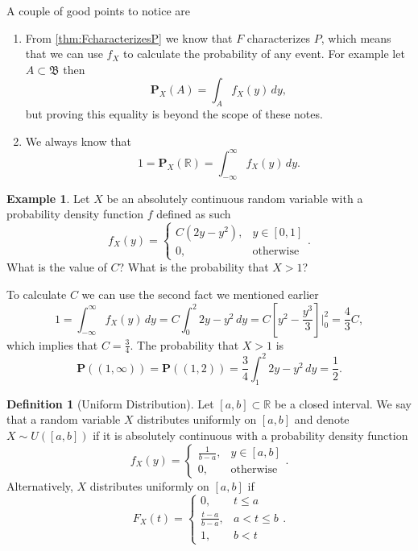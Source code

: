 \documentclass[11pt,a4paper]{article}
\theoremstyle{definition}
\newtheorem{definition}{Definition}[section]
\newtheorem{example}{Example}[section]
\theoremstyle{plain}
\newcommand{\R}{\mathbb{R}}
\begin{document}
  A couple of good points to notice are
  \begin{enumerate}
    \item From \autoref{thm:FcharacterizesP} we know that $F$ characterizes $P$,
    which means that we can use $f_X$ to calculate the probability of any
    event. For example let $A \subset \mathfrak B$ then
    \[
      \mathbf P_X(A) = \int_{A} f_X(y)\,dy,
    \]
    but proving this equality is beyond the scope of these notes.
    \item We always know that
    \[
      1 = \mathbf P_X(\R) = \int_{-\infty}^{\infty} f_X(y)\,dy.
    \]
  \end{enumerate}

  \begin{example}
    Let $X$ be an absolutely continuous random variable with a probability
    density function $f$ defined as such
    \[
      f_X(y) =
      \begin{cases}
        C(2y - y^2), &y \in [0,1] \\
        0, &\text{otherwise}
      \end{cases}.
    \]
    What is the value of $C$? What is the probability that $X > 1$?

    To calculate $C$ we can use the second fact we mentioned earlier
    \[
      1 =
      \int_{-\infty}^{\infty} f_X(y)\,dy =
      C \int_{0}^{2} 2y - y^2\,dy =
      C\left[y^2 - \frac{y^3}{3}\right]\biggr\vert_{0}^{2} =
      \frac{4}{3} C,
    \]
    which implies that $C = \frac{3}{4}$. The probability that $X > 1$ is
    \[
      \mathbf P\left((1,\infty)\right) =
      \mathbf P\left((1,2)\right) =
      \frac{3}{4} \int_{1}^{2} 2y - y^2\,dy =
      \frac{1}{2}.
    \]
  \end{example}

  \begin{definition}[Uniform Distribution]
    Let $[a,b] \subset \R$ be a closed interval. We say that a random 
    variable $X$ distributes uniformly on $[a,b]$ and denote $X \sim U([a,b])$
    if it is absolutely continuous with a probability density function
    \[
      f_X(y) =
      \begin{cases}
        \frac{1}{b-a}, &y \in [a,b] \\
        0, &\text{otherwise}
      \end{cases}.
    \]
    Alternatively, $X$ distributes uniformly on $[a,b]$ if
    \[
      F_X(t) =
      \begin{cases}
        0, &t \le a \\
        \frac{t-a}{b-a}, &a < t \le b \\
        1, &b < t
      \end{cases}.
    \]
  \end{definition}
\end{document}

